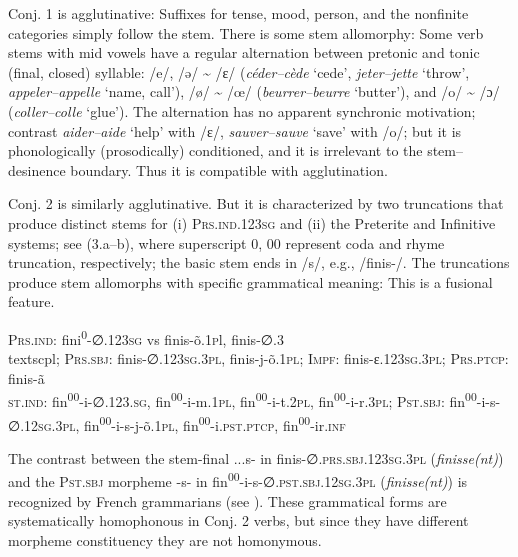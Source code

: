 \documentclass[output=paper, colorlinks,citecolor=brown]{langsci/langscibook}
\begin{document}
Conj. 1 is agglutinative: Suffixes for tense, mood, person, and the nonfinite categories simply follow the stem. There is some stem allomorphy: Some verb stems with mid vowels have a regular alternation between pretonic and tonic (final, closed) syllable: /e/, /ǝ/ {\textasciitilde} /ɛ/ (\textit{céder–cède} `cede', \textit{jeter–jette} `throw', \textit{appeler–appelle} `name, call'), /ø/ {\textasciitilde} /œ/ (\textit{beurrer–beurre} `butter'), and /o/ {\textasciitilde} /ɔ/ (\textit{coller–colle} `glue'). The alternation has no apparent synchronic motivation; contrast \textit{aider–aide} `help' with /ɛ/, \textit{sauver–sauve} `save' with /o/; but it is phonologically (prosodically) conditioned, and it is irrelevant to the stem–desinence boundary. Thus it is compatible with agglutination.

Conj. 2 is similarly agglutinative. But it is characterized by two truncations that produce distinct stems for (i) \textsc{Prs.ind.123sg} and (ii) the Preterite and Infinitive systems; see (3.a–b), where superscript 0, 00 represent coda and rhyme truncation, respectively; the basic stem ends in /s/, e.g., /finis-/. The truncations produce stem allomorphs with specific grammatical meaning: This is a fusional feature. 

\ea\label{ex:andersen_3}\ea
\glt \textsc{Prs.ind}: fini\textsuperscript{0}{}-∅.123\textsc{sg} vs finis-õ.1\textsc{p}l, finis-∅.3\\textsc{pl}; \textsc{Prs.sbj}: finis-∅.123\textsc{sg.3pl}, finis-j-õ.\textsc{1pl}; \textsc{Impf}: finis-ɛ.\textsc{123sg.3pl};  \textsc{Prs.ptcp}: finis-ã\\
\ex\label{ex:andersen_3b}
\glt \textsc{st.ind}: fin\textsuperscript{00}{}-i-∅.\textsc{123.sg}, fin\textsuperscript{00}{}-i-m.\textsc{1pl}, fin\textsuperscript{00}{}-i-t.\textsc{2pl}, fin\textsuperscript{00}{}-i-r.\textsc{3pl}; \textsc{Pst.sbj}: fin\textsuperscript{00}{}-i-s-∅.12\textsc{sg.3pl}, fin\textsuperscript{00}{}-i-s-j-õ.\textsc{1pl}, fin\textsuperscript{00}{}-i.\textsc{pst.ptcp}, fin\textsuperscript{00}{}-ir.\textsc{inf} \z\z

\begin{sloppypar}
The contrast between the stem-final ...s- in finis-∅.\textsc{prs.sbj.123sg.3pl} (\textit{finisse(nt)})  and the \textsc{Pst.sbj} morpheme -s- in fin\textsuperscript{00}{}-i-s-∅.\textsc{pst.sbj.12sg.3pl} (\textit{finisse(nt)})  is recognized by French grammarians (see \citealt[588–589]{Grevisse1961}). These grammatical forms are systematically homophonous in Conj. 2 verbs, but since they have different morpheme constituency they are not homonymous. 
\end{sloppypar}
\end{document}

